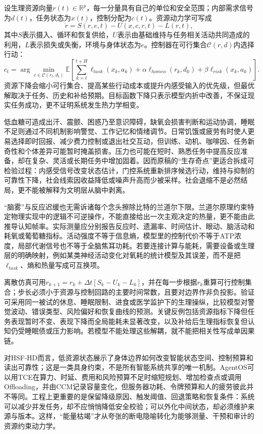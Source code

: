 设生理资源向量$r(t)\in\mathbb R^p$，每一分量具有自己的单位和安全范围；内部需求信号为$d(t)$，任务状态为$x(t)$，控制分配为$c(t)$。资源动力学可写成
\begin{equation}
 \dot r=S(r,e,t)-U(x,c,r,t)-L(r,t),
\end{equation}
其中$S$表示摄入、循环和恢复供给，$U$表示由基础维持与任务相关活动共同造成的利用，$L$表示损失或失衡，环境与身体状态为$e$。控制器在可行集合$\mathcal C(r,d)$内选择行动：
\begin{equation}
 c_t=\arg\min_{c\in\mathcal C(r_t,d_t)}\mathbb E\!\left[\sum_{k=t}^{t+H}\ell_{task}(x_k,a_k)+\alpha\ell_{homeo}(r_k,d_k)+\beta\ell_{risk}(x_k,a_k)\right].
\end{equation}
资源下降会缩小可行集合、提高某些行动成本或提升内感受输入的优先级，但最优解取决于任务、历史和补给预期。目标函数下降只表示模型内折中改善，不保证现实任务成功，更不证明系统发生热力学相变。

低血糖可造成出汗、震颤、困惑乃至意识障碍，缺氧会损害判断和运动协调，睡眠不足则通过不同机制影响警觉、工作记忆和情绪调节。日常饥饿或疲劳有时使人更易选择即时回报、减少费力控制或退出社交互动，但训练、动机、咖啡因、任务新奇性和个体差异可能暂时掩盖损害。压力也可能在短时、熟悉任务中提高反应准备，却在复杂、灵活或长期任务中增加固着。因而原稿的“生存奇点”更适合拆成可检验过程：内感受信号改变状态估计，门控系统重新排序候选行动，维持与抑制的可靠性下降，社会线索因收益降低或噪声升高而少被采样。社会退缩不是必然结局，更不能被解释为文明层从脑中剥离。

“脑雾”与反应迟缓也无需诉诸每个念头擦除比特的兰道尔下限。兰道尔原理约束特定物理实现中的逻辑不可逆操作，不能直接给出一次主观决定的热量，更不能由此推导认知帧率。实际测量应分别报告反应时、遗漏率、时间估计、眼动、脑活动和耗氧或葡萄糖指标。活动强度不等于信息熵，模型里的控制代价不等于ATP浓度，局部代谢信号也不等于全脑焦耳功耗。若要连接计算与能耗，需要设备或生理层的明确映射，例如某类神经活动变化对氧耗的统计模型及其误差，而不是把$\ell_{task}$、熵和热量写成可互换项。

离散仿真可用$r_{k+1}=r_k+\Delta t[S_k-U_k-L_k]$，并在每一步根据$r_k$重算可行控制集合；步长必须小于资源与控制回路的主要时间常数，且要对边界作非负投影。验证可采用同一被试的休息、睡眠限制、进食或医学监护下的生理操纵，比较模型对警觉波动、错误类型、风险偏好和恢复曲线的预测。关键反例包括资源指标下降但任务表现暂时不变、表现下降而全局能耗未显著改变，以及补给后生理指标恢复但认知仍受睡眠债或压力影响。若模型不能处理这些解耦，就不能把相关性写成单因果链。

对HSF-HD而言，低资源状态展示了身体边界如何改变智能状态空间、控制预算和读出可靠性；这是一类具身约束，不是所有智能系统共享的唯一机制。AgentOS可以用TCE在算力、时延、费用和风险预算不足时缩短规划、增加检查点或调用Offloading，并由CCM记录容量变化，但服务器功耗、令牌预算和人的疲劳彼此并不等同。工程上更重要的是保留降级原因、触发阈值、回退策略和恢复条件：系统可以减少并发任务，却不应悄悄降低安全校验；可以外化中间状态，却必须维护来源与版本。这样，“能量枯竭”才从夸张的断电隐喻转化为能够测量、干预和审计的资源约束动力学。

